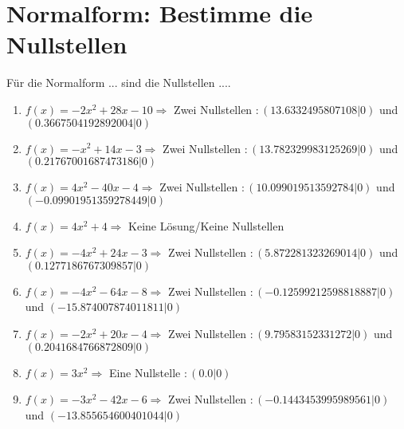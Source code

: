 \documentclass{article}%
\begin{document}
\section{Normalform: Bestimme die Nullstellen}%
\label{sec:NormalformBestimmedieNullstellen}%
Für die Normalform ... sind die Nullstellen ....%
\begin{enumerate}[label=\alph*)]%
\item%
\newline\vspace{0.5cm}$f(x)=-2x^2 + 28x - 10 \Rightarrow $ Zwei Nullstellen $: (13.6332495807108|0) $ und $ (0.3667504192892004|0) $%
\item%
\newline\vspace{0.5cm}$f(x)=-x^2 + 14x - 3 \Rightarrow $ Zwei Nullstellen $: (13.782329983125269|0) $ und $ (0.21767001687473186|0) $%
\item%
\newline\vspace{0.5cm}$f(x)=4x^2 - 40x - 4 \Rightarrow $ Zwei Nullstellen $: (10.099019513592784|0) $ und $ (-0.09901951359278449|0) $%
\item%
\newline\vspace{0.5cm}$f(x)=4x^2 + 4 \Rightarrow  $ Keine Lösung/Keine Nullstellen $ $%
\item%
\newline\vspace{0.5cm}$f(x)=-4x^2 + 24x - 3 \Rightarrow $ Zwei Nullstellen $: (5.872281323269014|0) $ und $ (0.1277186767309857|0) $%
\item%
\newline\vspace{0.5cm}$f(x)=-4x^2 - 64x - 8 \Rightarrow $ Zwei Nullstellen $: (-0.12599212598818887|0) $ und $ (-15.874007874011811|0) $%
\item%
\newline\vspace{0.5cm}$f(x)=-2x^2 + 20x - 4 \Rightarrow $ Zwei Nullstellen $: (9.79583152331272|0) $ und $ (0.2041684766872809|0) $%
\item%
\newline\vspace{0.5cm}$f(x)=3x^2 \Rightarrow $ Eine Nullstelle $: (0.0|0) $%
\item%
\newline\vspace{0.5cm}$f(x)=-3x^2 - 42x - 6 \Rightarrow $ Zwei Nullstellen $: (-0.1443453995989561|0) $ und $ (-13.855654600401044|0) $%

\end{enumerate}
\end{document}
